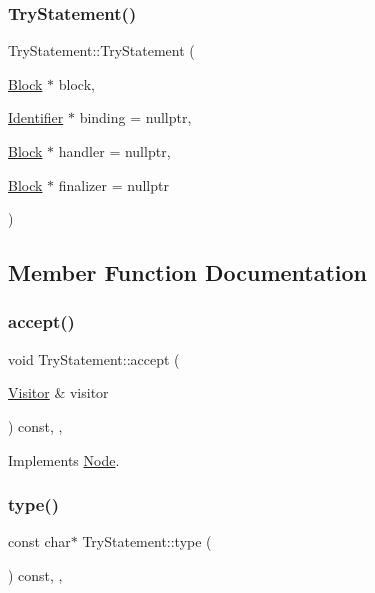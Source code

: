 \subsubsection{\texorpdfstring{Try\+Statement()}{TryStatement()}}
{\footnotesize\ttfamily Try\+Statement\+::\+Try\+Statement (\begin{DoxyParamCaption}\item[{\hyperlink{struct_block}{Block} $\ast$}]{block,  }\item[{\hyperlink{struct_identifier}{Identifier} $\ast$}]{binding = {\ttfamily nullptr},  }\item[{\hyperlink{struct_block}{Block} $\ast$}]{handler = {\ttfamily nullptr},  }\item[{\hyperlink{struct_block}{Block} $\ast$}]{finalizer = {\ttfamily nullptr} }\end{DoxyParamCaption})\hspace{0.3cm}{\ttfamily [inline]}}



\subsection{Member Function Documentation}
\mbox{\label{struct_try_statement_af223e8205727843aa77651caeb89b805}} 
\subsubsection{\texorpdfstring{accept()}{accept()}}
{\footnotesize\ttfamily void Try\+Statement\+::accept (\begin{DoxyParamCaption}\item[{\hyperlink{struct_visitor}{Visitor} \&}]{visitor }\end{DoxyParamCaption}) const\hspace{0.3cm}{\ttfamily [inline]}, {\ttfamily [override]}, {\ttfamily [virtual]}}



Implements \hyperlink{struct_node_a10bd7af968140bbf5fa461298a969c71}{Node}.

\mbox{\label{struct_try_statement_a1113af03994575c6d5c0f814642f4503}} 
\subsubsection{\texorpdfstring{type()}{type()}}
{\footnotesize\ttfamily const char$\ast$ Try\+Statement\+::type (\begin{DoxyParamCaption}{ }\end{DoxyParamCaption}) const\hspace{0.3cm}{\ttfamily [inline]}, {\ttfamily [override]}, {\ttfamily [virtual]}}



